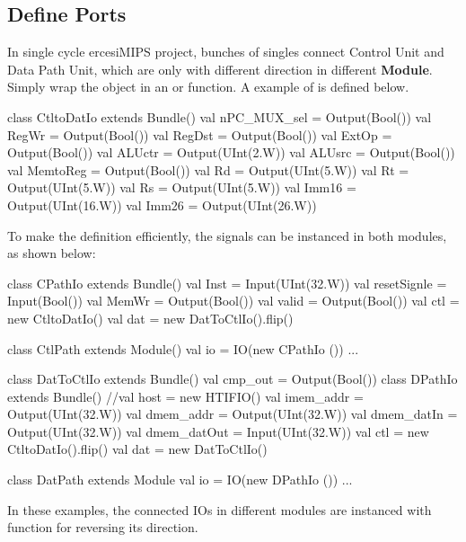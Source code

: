 \documentclass[a4paper]{article}
\begin{document}
\subsection{Define Ports}\label{sub:io}
In single cycle ercesiMIPS project, bunches of singles connect Control Unit and Data Path Unit, which are only with different direction in different \textbf{Module}. Simply wrap the object in an  or  function. A example of  is defined below.      
\begin{scala}
class CtltoDatIo extends Bundle()
{
	val nPC_MUX_sel = Output(Bool())
	val RegWr		= Output(Bool())
	val RegDst		= Output(Bool())
	val ExtOp		= Output(Bool())
	val ALUctr		= Output(UInt(2.W))
	val ALUsrc		= Output(Bool())
	val MemtoReg	= Output(Bool())
	val Rd 			= Output(UInt(5.W))
	val Rt 			= Output(UInt(5.W))
	val Rs 			= Output(UInt(5.W))
	val Imm16 		= Output(UInt(16.W))
	val	Imm26		= Output(UInt(26.W))
}
\end{scala}
To make the definition efficiently, the signals can be instanced in both modules, as shown below:
\begin{multicols}{2}
\begin{scala}
class CPathIo extends Bundle()
{
	val Inst 		= Input(UInt(32.W))
	val resetSignle = Input(Bool())
	val MemWr		= Output(Bool())
	val valid		= Output(Bool())
	val ctl 		= new CtltoDatIo()
	val dat 		= new DatToCtlIo().flip()
}

class CtlPath extends Module()
{
	val io 			= IO(new CPathIo ())
	...
}
\end{scala}
\columnbreak
\begin{scala}
class DatToCtlIo extends Bundle()
{
	val cmp_out = Output(Bool())
}
class DPathIo extends Bundle()
{
	//val host		= new HTIFIO()
	val imem_addr	= Output(UInt(32.W))
	val dmem_addr	= Output(UInt(32.W))
	val dmem_datIn	= Output(UInt(32.W))
	val dmem_datOut	= Input(UInt(32.W))
	val ctl  		= new CtltoDatIo().flip()
	val dat  		= new DatToCtlIo()
}

class DatPath extends Module {
	val io = IO(new DPathIo ())
	...
}
\end{scala}
\end{multicols}

In these examples, the connected IOs in different modules are instanced with 
function for reversing its direction.
\end{document}
